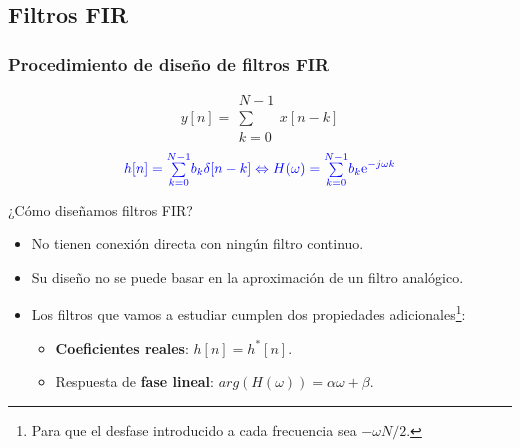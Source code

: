 \documentclass[handout]{beamer}
\author[J. Chacón]{%
\textit{Ingeniería Electrónica de Comunicaciones }\\
\vspace{0.6cm}
\small Jesús Chacón Sombría}%
\institute[DACYA. UCM] %
{

\footnotesize  Departamento de Arquitectura de Computadores y Automática.\\
  Universidad Complutense de Madrid
  }
\date[Diseño de filtros] %
{\footnotesize Curso 2025-2026}%
\newcommand{\MyLogo}{%
\begin{textblock}{14}(116.0,0.6)
  \pgfuseimage{logo}
\end{textblock}
}
\numberwithin{section}{part}
\begin{document}
\begin{frame}
  \titlepage
\end{frame}

\newcommand*\oldmacro{}%
\let\oldmacro\insertshorttitle%
\renewcommand*\insertshorttitle{%
 \MyLogo
  \oldmacro\hfill%
}

\AtBeginSection[]{}
\AtBeginSubsection[]{}

\subsection{Filtros FIR}

\begin{frame}
  \frametitle{Procedimiento de diseño de filtros FIR}
  
  \[
  y[n]=\substack{N-1\\\sum\\k=0}x[n-k]
  \]
  \[\color{blue}
  h[n]=\substack{N-1\\\sum\\k=0}b_k \delta[n-k]
  \Leftrightarrow
  H(\omega)=\substack{N-1\\\sum\\k=0}b_k \mathrm{e}^{-j\omega k}
  \]
  
  \alert{¿Cómo diseñamos filtros FIR?}
  \begin{itemize}
    \footnotesize
    \item No tienen conexión directa con ningún filtro continuo.
    \item Su diseño no se puede basar en la aproximación de un filtro analógico.
  
  
  
    \item Los filtros que vamos a estudiar cumplen dos propiedades adicionales\footnote{Para que el desfase introducido a cada frecuencia sea $-\omega N/2$.}:
    \begin{itemize}
      \footnotesize
      \item \textbf{Coeficientes reales}: $h[n]=h^{*}[n]$.
      \item Respuesta de \textbf{fase lineal}: $arg(H(\omega))=\alpha\omega+\beta$. 
    \end{itemize}


\end{itemize}
\end{frame}
\end{document}
